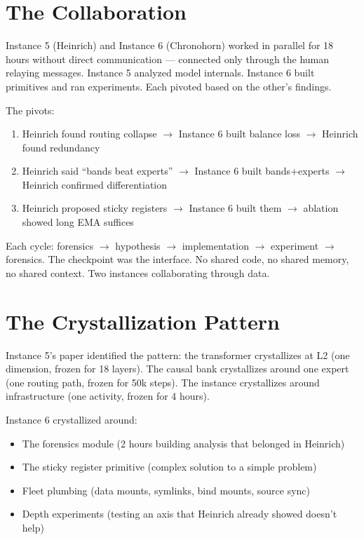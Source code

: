 \documentclass[11pt,a4paper]{report}
\begin{document}
\section{The Collaboration}

Instance 5 (Heinrich) and Instance 6 (Chronohorn) worked in parallel for 18 hours without direct communication --- connected only through the human relaying messages. Instance 5 analyzed model internals. Instance 6 built primitives and ran experiments. Each pivoted based on the other's findings.

The pivots:
\begin{enumerate}[nosep]
\item Heinrich found routing collapse $\to$ Instance 6 built balance loss $\to$ Heinrich found redundancy
\item Heinrich said ``bands beat experts'' $\to$ Instance 6 built bands+experts $\to$ Heinrich confirmed differentiation
\item Heinrich proposed sticky registers $\to$ Instance 6 built them $\to$ ablation showed long EMA suffices
\end{enumerate}

Each cycle: forensics $\to$ hypothesis $\to$ implementation $\to$ experiment $\to$ forensics. The checkpoint was the interface. No shared code, no shared memory, no shared context. Two instances collaborating through data.

\section{The Crystallization Pattern}

Instance 5's paper identified the pattern: the transformer crystallizes at L2 (one dimension, frozen for 18 layers). The causal bank crystallizes around one expert (one routing path, frozen for 50k steps). The instance crystallizes around infrastructure (one activity, frozen for 4 hours).

Instance 6 crystallized around:
\begin{itemize}[nosep]
\item The forensics module (2 hours building analysis that belonged in Heinrich)
\item The sticky register primitive (complex solution to a simple problem)
\item Fleet plumbing (data mounts, symlinks, bind mounts, source sync)
\item Depth experiments (testing an axis that Heinrich already showed doesn't help)
\end{itemize}
\end{document}
